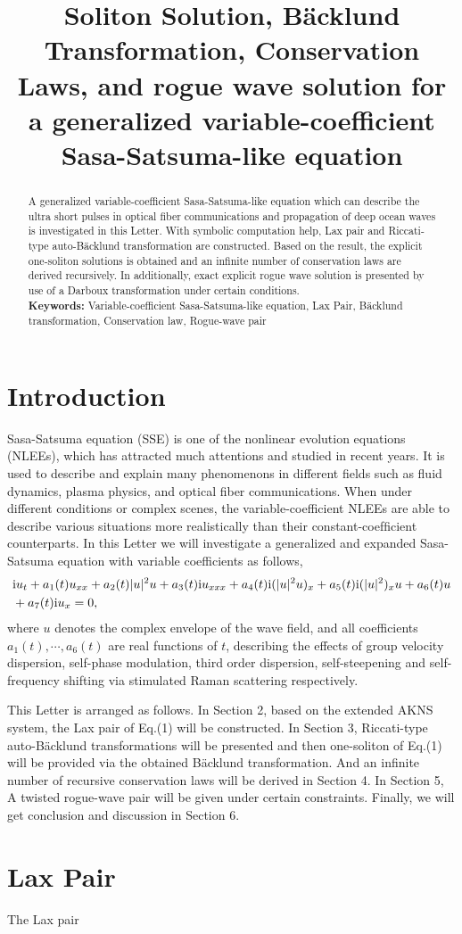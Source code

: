 \documentclass[12pt]{article}
\title{\large\bfseries Soliton Solution, B\"acklund Transformation, Conservation Laws, and rogue wave solution for a generalized variable-coefficient Sasa-Satsuma-like equation}
\author{}
\begin{document}
\maketitle

\begin{abstract}
A generalized variable-coefficient Sasa-Satsuma-like equation which can describe the ultra short pulses in optical fiber communications and propagation of deep ocean waves is investigated in this Letter. With symbolic computation help, Lax pair and Riccati-type auto-B\"acklund transformation are constructed. Based on the result, the explicit one-soliton solutions is obtained and an infinite number of conservation laws are derived recursively. In additionally, exact explicit rogue wave solution is presented by use of a Darboux transformation under certain conditions. \\
\indent\textbf{Keywords:} Variable-coefficient Sasa-Satsuma-like equation, Lax Pair, B\"acklund transformation, Conservation law, Rogue-wave pair
\end{abstract}

\section{Introduction}
Sasa-Satsuma equation (SSE) is one of the nonlinear evolution equations (NLEEs), which has attracted much attentions and studied in recent years. It is used to describe and explain many phenomenons in different fields such as fluid dynamics, plasma physics, and optical fiber communications. When under different conditions or complex scenes, the variable-coefficient NLEEs are able to describe various situations more realistically than their constant-coefﬁcient counterparts. In this Letter we will investigate a generalized and expanded Sasa-Satsuma equation with variable coefficients as follows,
\begin{align}
  & \mathrm{i}u_{t} + a_{1}(t)u_{xx} + a_2(t)|u|^{2}u + a_3(t)\mathrm{i}u_{xxx} + a_{4}(t)\mathrm{i}(|u|^{2}u)_{x} + a_{5}(t)\mathrm{i}(|u|^{2})_{x}u + a_{6}(t)u \notag\\
  & + a_{7}(t)\mathrm{i}u_{x}=0,
\end{align}
where $u$ denotes the complex envelope of the wave field, and all coefficients $a_{1}(t), \cdots, a_{6}(t)$ are real functions of $t$, describing the effects of group velocity dispersion, self-phase modulation, third order dispersion, self-steepening and self-frequency shifting via stimulated Raman scattering respectively.

This Letter is arranged as follows. In Section 2, based on the extended AKNS system, the Lax pair of Eq.(1) will be constructed. In Section 3, Riccati-type auto-B\"acklund transformations will be presented and then one-soliton of Eq.(1) will be provided via the obtained B\"acklund transformation. And an infinite number of recursive conservation laws will be derived in Section 4. In Section 5, A twisted rogue-wave pair will be given under certain constraints. Finally, we will get conclusion and discussion in Section 6.

\section{Lax Pair}
    The Lax pair 
\end{document}
